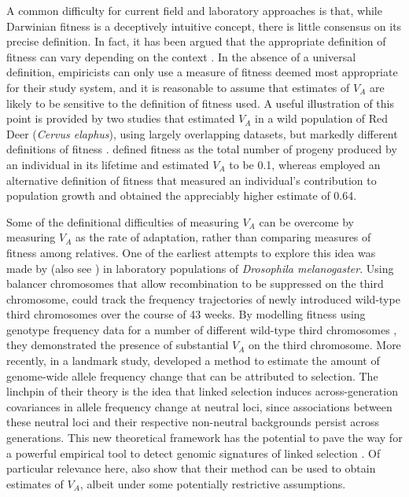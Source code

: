 \documentclass[12pt]{article}
\begin{document}
\begin{bibunit}
A common difficulty for current field and laboratory approaches is that, while Darwinian fitness is a deceptively intuitive concept, there is little consensus on its precise definition. In fact, it has been argued that the appropriate definition of fitness can vary depending on the context \citep{hendry2018contemporary}. In the absence of a universal definition, empiricists can only use a measure of fitness deemed most appropriate for their study system, and it is reasonable to assume that estimates of $V_A$ are likely to be sensitive to the definition of fitness used. A useful illustration of this point is provided by two studies that estimated $V_A$ in a wild population of Red Deer (\emph{Cervus elaphus}), using largely overlapping datasets, but markedly different definitions of fitness \citep{kruuk2000heritability, foerster2007sexually}. \citet{kruuk2000heritability} defined fitness as the total number of progeny produced by an individual in its lifetime and estimated $V_A$ to be 0.1, whereas \cite{foerster2007sexually} employed an alternative definition of fitness that measured an individual’s contribution to population growth \citep{coulson2006estimating} and obtained the appreciably higher estimate of 0.64. 

Some of the definitional difficulties of measuring $V_A$ can be overcome by measuring $V_A$ as the rate of adaptation, rather than comparing measures of fitness among relatives. One of the earliest attempts to explore this idea was made by \citet{fowler1997genetic} (also see \citet{gardner2005genetic}) in laboratory populations of \emph{Drosophila melanogaster}. Using balancer chromosomes  that allow recombination to be suppressed on the third chromosome, \citet{fowler1997genetic} could track the frequency trajectories of newly introduced wild-type third chromosomes over the course of 43 weeks. By modelling fitness using genotype frequency data for a number of different wild-type third chromosomes  \citep{barton2000measuring}, they demonstrated the presence of substantial $V_A$ on the third chromosome. More recently, in a landmark study, \citet{buffalo2019linked} developed a method to estimate the amount of genome-wide allele frequency change that can be attributed to selection. The linchpin of their theory is the idea that linked selection induces across-generation covariances in allele frequency change at neutral loci, since associations between these neutral loci and their respective non-neutral backgrounds persist across generations. This new theoretical framework has the potential to pave the way for a powerful empirical tool to detect genomic signatures of linked selection \citep{Buffalo.2020, simon2024contribution}. Of particular relevance here, \citet{buffalo2019linked} also show that their method can be used to obtain estimates of $V_A$, albeit under some potentially restrictive assumptions.


\end{bibunit}
\end{document}
